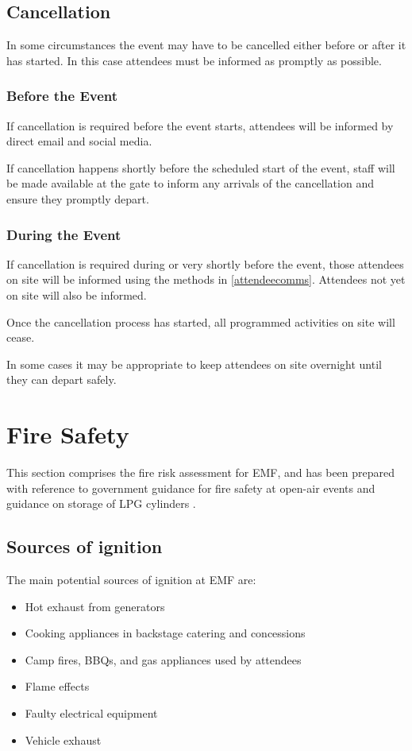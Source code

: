 \subsection{Cancellation}\label{cancellation}
In some circumstances the event may have to be cancelled either before or after it has
started. In this case attendees must be informed as promptly as possible.

\subsubsection{Before the Event}
If cancellation is required before the event starts, attendees will be informed by
direct email and social media. 

If cancellation happens shortly before the scheduled start of the event, staff will
be made available at the gate to inform any arrivals of the cancellation and ensure
they promptly depart.

\subsubsection{During the Event}
If cancellation is required during or very shortly before the event, those attendees
on site will be informed using the methods in \cref{attendeecomms}. Attendees
not yet on site will also be informed.

Once the cancellation process has started, all programmed activities on site will
cease.

In some cases it may be appropriate to keep attendees on site overnight
until they can depart safely.

\newpage

\section{Fire Safety}\label{fire}

This section comprises the fire risk assessment for EMF, and has been prepared with reference
to government guidance for fire safety at open-air events \cite{firesafety} and guidance on storage
of LPG cylinders \cite{lpgstorage}.

\subsection{Sources of ignition}

The main potential sources of ignition at EMF are:

\begin{itemize}
\tightlist
\item Hot exhaust from generators
\item Cooking appliances in backstage catering and concessions
\item Camp fires, BBQs, and gas appliances used by attendees
\item Flame effects
\item Faulty electrical equipment
\item Vehicle exhaust
\end{itemize}

